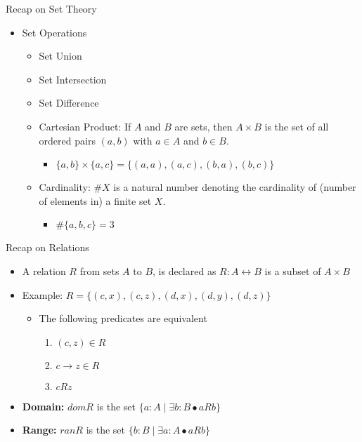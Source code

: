 \documentclass[aspectratio=169]{beamer}
\begin{document}
\begin{frame}{Recap on Set Theory}
    \begin{itemize}
        \item Set Operations
        \begin{itemize}
            \item Set Union
            \item Set Intersection
            \item Set Difference
            \item Cartesian Product: If $A$ and $B$ are sets, then $A \times B$ is the set of all ordered pairs $(a, b)$ with $a \in A$ and $b \in B$.
            \begin{itemize}
                \item $\{a, b\} \times \{a, c\} = \{(a, a), (a, c), (b, a), (b, c)\}$
            \end{itemize}
            \item Cardinality: $\#X$ is a natural number denoting the cardinality of (number of elements in) a finite set $X$.
            \begin{itemize}
                \item $\#\{a, b, c\} = 3$
            \end{itemize}
        \end{itemize}
    \end{itemize}
\end{frame}

\begin{frame}{Recap on Relations}
    \begin{itemize}
        \item A relation $R$ from sets $A$ to $B$, is declared as $R : A \leftrightarrow B$ is a subset of $A \times B$
        \item Example: $R = \{(c, x), (c, z), (d, x), (d, y), (d, z)\}$
        \begin{itemize}
            \item The following predicates are equivalent
            \begin{enumerate}
                \item $(c, z) \in R$
                \item $c \rightarrow z \in R$
                \item $cRz$
            \end{enumerate}
        \end{itemize}
        \item \textbf{Domain:} $dom R$ is the set $\{a : A \mid \exists b : B \bullet a R b\}$
        \item \textbf{Range:} $ran R$ is the set $\{b : B \mid \exists a : A \bullet a R b\}$
    \end{itemize}
\end{frame}
\end{document}

